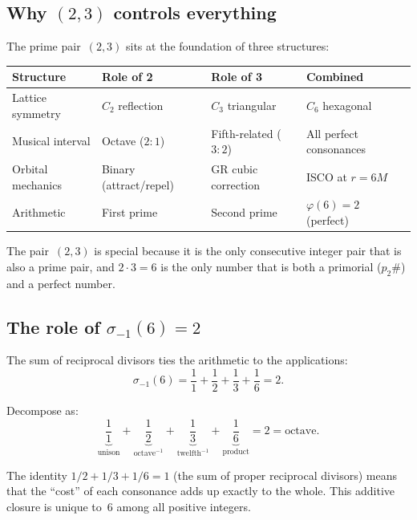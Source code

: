 \documentclass[preprint]{revtex4-2}
\begin{document}
\subsection{Why $(2, 3)$ controls everything}

The prime pair~$(2, 3)$ sits at the foundation of three structures:

\begin{center}
\begin{tabular}{llll}
\toprule
Structure & Role of 2 & Role of 3 & Combined \\
\midrule
Lattice symmetry & $C_2$ reflection & $C_3$ triangular & $C_6$ hexagonal \\
Musical interval & Octave ($2{:}1$) & Fifth-related ($3{:}2$) & All perfect consonances \\
Orbital mechanics & Binary (attract/repel) & GR cubic correction & ISCO at $r = 6M$ \\
Arithmetic & First prime & Second prime & $\varphi(6) = 2$ (perfect) \\
\bottomrule
\end{tabular}
\end{center}

The pair~$(2,3)$ is special because it is the only consecutive integer pair that is also a prime pair, and $2 \cdot 3 = 6$ is the only number that is both a primorial ($p_2\#$) and a perfect number.

\subsection{The role of $\sigma_{-1}(6) = 2$}

The sum of reciprocal divisors ties the arithmetic to the applications:
\begin{equation}
\sigma_{-1}(6) = \frac{1}{1} + \frac{1}{2} + \frac{1}{3} + \frac{1}{6} = 2.
\end{equation}

Decompose as:
\begin{equation}
\underbrace{\frac{1}{1}}_{\text{unison}} + \underbrace{\frac{1}{2}}_{\text{octave}^{-1}} + \underbrace{\frac{1}{3}}_{\text{twelfth}^{-1}} + \underbrace{\frac{1}{6}}_{\text{product}} = 2 = \text{octave}.
\end{equation}

The identity $1/2 + 1/3 + 1/6 = 1$ (the sum of proper reciprocal divisors) means that the ``cost'' of each consonance adds up exactly to the whole. This additive closure is unique to~6 among all positive integers.
\end{document}
